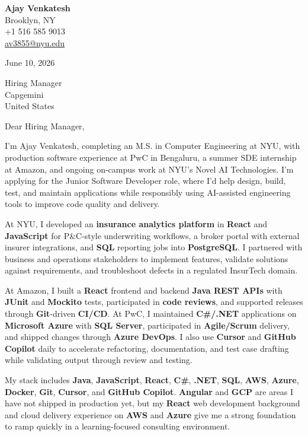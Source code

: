 \documentclass[letterpaper,11pt]{article}
\begin{document}
\begin{flushleft}
\textbf{\large Ajay Venkatesh} \\
Brooklyn, NY \\
+1 516 585 9013 \\
\href{mailto:av3855@nyu.edu}{av3855@nyu.edu}
\end{flushleft}
\vspace{10pt}
June 10, 2026
\vspace{6pt}

Hiring Manager \\
Capgemini \\
United States

\vspace{10pt}

Dear Hiring Manager,

I'm Ajay Venkatesh, completing an M.S. in Computer Engineering at NYU, with production software experience at PwC in Bengaluru, a summer SDE internship at Amazon, and ongoing on-campus work at NYU's Novel AI Technologies. I'm applying for the Junior Software Developer role, where I'd help design, build, test, and maintain applications while responsibly using AI-assisted engineering tools to improve code quality and delivery.

At NYU, I developed an \textbf{insurance analytics platform} in \textbf{React} and \textbf{JavaScript} for P\&C-style underwriting workflows, a broker portal with external insurer integrations, and \textbf{SQL} reporting jobs into \textbf{PostgreSQL}. I partnered with business and operations stakeholders to implement features, validate solutions against requirements, and troubleshoot defects in a regulated InsurTech domain.

At Amazon, I built a \textbf{React} frontend and backend \textbf{Java REST APIs} with \textbf{JUnit} and \textbf{Mockito} tests, participated in \textbf{code reviews}, and supported releases through \textbf{Git}-driven \textbf{CI/CD}. At PwC, I maintained \textbf{C\#/.NET} applications on \textbf{Microsoft Azure} with \textbf{SQL Server}, participated in \textbf{Agile/Scrum} delivery, and shipped changes through \textbf{Azure DevOps}. I also use \textbf{Cursor} and \textbf{GitHub Copilot} daily to accelerate refactoring, documentation, and test case drafting while validating output through review and testing.

My stack includes \textbf{Java}, \textbf{JavaScript}, \textbf{React}, \textbf{C\#}, \textbf{.NET}, \textbf{SQL}, \textbf{AWS}, \textbf{Azure}, \textbf{Docker}, \textbf{Git}, \textbf{Cursor}, and \textbf{GitHub Copilot}. \textbf{Angular} and \textbf{GCP} are areas I have not shipped in production yet, but my \textbf{React} web development background and cloud delivery experience on \textbf{AWS} and \textbf{Azure} give me a strong foundation to ramp quickly in a learning-focused consulting environment.
\end{document}
